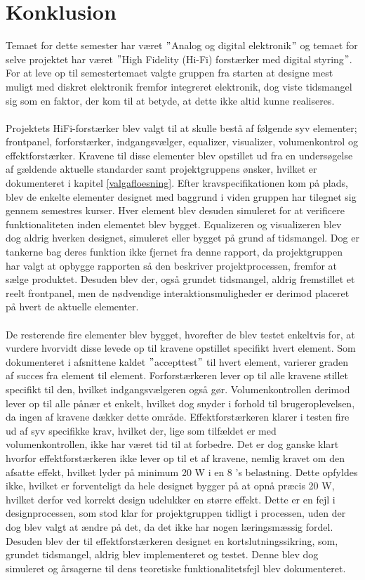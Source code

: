 \chapter{Konklusion}
\label{konklusion}
Temaet for dette semester har været $"$Analog og digital elektronik$"$ og temaet for selve projektet har været $"$High Fidelity (Hi-Fi) forstærker med digital styring$"$. For at leve op til semestertemaet valgte gruppen fra starten at designe mest muligt med diskret elektronik fremfor integreret elektronik, dog viste tidsmangel sig som en faktor, der kom til at betyde, at dette ikke altid kunne realiseres.\\\\
Projektets HiFi-forstærker blev valgt til at skulle bestå af følgende syv elementer; frontpanel, forforstærker, indgangsvælger, equalizer, visualizer, volumenkontrol og effektforstærker. Kravene til disse elementer blev opstillet ud fra en undersøgelse af gældende aktuelle standarder samt projektgruppens ønsker, hvilket er dokumenteret i kapitel \ref{valgafloesning}. Efter kravspecifikationen kom på plads, blev de enkelte elementer designet med baggrund i viden gruppen har tilegnet sig gennem semestres kurser. Hver element blev desuden simuleret for at verificere funktionaliteten inden elementet blev bygget. Equalizeren og visualizeren blev dog aldrig hverken designet, simuleret eller bygget på grund af tidsmangel. Dog er tankerne bag deres funktion ikke fjernet fra denne rapport, da projektgruppen har valgt at opbygge rapporten så den beskriver projektprocessen, fremfor at sælge produktet. Desuden blev der, også grundet tidsmangel, aldrig fremstillet et reelt frontpanel, men de nødvendige interaktionsmuligheder er derimod placeret på hvert de aktuelle elementer.\\\\
De resterende fire elementer blev bygget, hvorefter de blev testet enkeltvis for, at vurdere hvorvidt disse levede op til kravene opstillet specifikt hvert element. Som dokumenteret i afsnittene kaldet $"$accepttest$"$ til hvert element, varierer graden af succes fra element til element. Forforstærkeren lever op til alle kravene stillet specifikt til den, hvilket indgangsvælgeren også gør. Volumenkontrollen derimod lever op til alle pånær et enkelt, hvilket dog snyder i forhold til brugeroplevelsen, da ingen af kravene dækker dette område. Effektforstærkeren klarer i testen fire ud af syv specifikke krav, hvilket der, lige som tilfældet er med volumenkontrollen, ikke har været tid til at forbedre. Det er dog ganske klart hvorfor effektforstærkeren ikke lever op til et af kravene, nemlig kravet om den afsatte effekt, hvilket lyder på minimum 20 W i en 8 \ohm 's belastning. Dette opfyldes ikke, hvilket er forventeligt da hele designet bygger på at opnå præcis 20 W, hvilket derfor ved korrekt design udelukker en større effekt. Dette er en fejl i designprocessen, som stod klar for projektgruppen tidligt i processen, uden der dog blev valgt at ændre på det, da det ikke har nogen læringsmæssig fordel. Desuden blev der til effektforstærkeren designet en kortslutningssikring, som, grundet tidsmangel, aldrig blev implementeret og testet. Denne blev dog simuleret og årsagerne til dens teoretiske funktionalitetsfejl blev dokumenteret.\\\\
